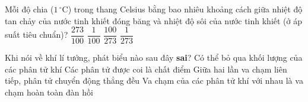 	\begin{ex}%
		Mỗi độ chia ($1\,^\circ\text{C}$) trong thang Celsius bằng bao nhiêu khoảng cách giữa nhiệt độ tan chảy của nước tinh khiết đóng băng và nhiệt độ sôi của nước tinh khiết (ở áp suất tiêu chuẩn)?
		\choice
		{$\dfrac{273}{100}$}
		{\True $\dfrac{1}{100}$}
		{$\dfrac{100}{273}$}
		{$\dfrac{1}{273}$}
	\end{ex}

	\begin{ex}%
		Khi nói về khí lí tưởng, phát biểu nào sau đây \textbf{sai}?
		\choice
		{\True Có thể bỏ qua khối lượng của các phân tử khí}
		{Các phân tử được coi là chất điểm}
		{Giữa hai lần va chạm liên tiếp, phân tử chuyển động thẳng đều}
		{Va chạm của các phân tử khí với nhau là va chạm hoàn toàn đàn hồi}
	\end{ex}

